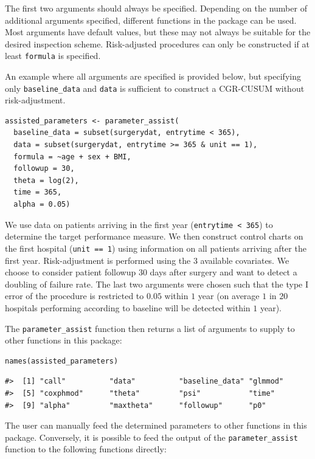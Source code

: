 The first two arguments should always be specified. Depending on the number of additional arguments specified, different functions in the package can be used. Most arguments have default values, but these may not always be suitable for the desired inspection scheme. Risk-adjusted procedures can only be constructed if at least \texttt{formula} is specified.

An example where all arguments are specified is provided below, but specifying only \texttt{baseline\_data} and \texttt{data} is sufficient to construct a CGR-CUSUM without risk-adjustment.

\begin{verbatim}
assisted_parameters <- parameter_assist(
  baseline_data = subset(surgerydat, entrytime < 365), 
  data = subset(surgerydat, entrytime >= 365 & unit == 1), 
  formula = ~age + sex + BMI, 
  followup = 30,
  theta = log(2),
  time = 365,
  alpha = 0.05)
\end{verbatim}

We use data on patients arriving in the first year (\texttt{entrytime\ \textless{}\ 365}) to determine the target performance measure. We then construct control charts on the first hospital (\texttt{unit\ ==\ 1}) using information on all patients arriving after the first year. Risk-adjustment is performed using the \(3\) available covariates. We choose to consider patient followup \(30\) days after surgery and want to detect a doubling of failure rate. The last two arguments were chosen such that the type I error of the procedure is restricted to \(0.05\) within \(1\) year (on average \(1\) in \(20\) hospitals performing according to baseline will be detected within \(1\) year).

The \texttt{parameter\_assist} function then returns a list of arguments to supply to other functions in this package:

\begin{verbatim}
names(assisted_parameters)
\end{verbatim}

\begin{verbatim}
#>  [1] "call"          "data"          "baseline_data" "glmmod"       
#>  [5] "coxphmod"      "theta"         "psi"           "time"         
#>  [9] "alpha"         "maxtheta"      "followup"      "p0"
\end{verbatim}

The user can manually feed the determined parameters to other functions in this package. Conversely, it is possible to feed the output of the \texttt{parameter\_assist} function to the following functions directly:

